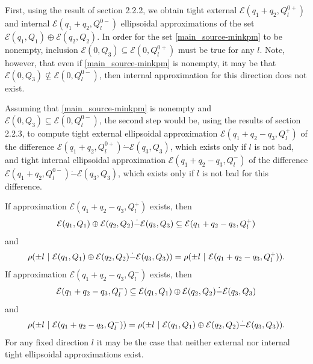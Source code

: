 \documentclass[letterpaper,10pt,english]{sphinxmanual}
\begin{document}
First, using the result of section 2.2.2, we obtain tight external
${\mathcal E}(q_1+q_2,Q_l^{0+})$ and internal
${\mathcal E}(q_1+q_2,Q_l^{0-})$ ellipsoidal approximations of the
set ${\mathcal E}(q_1,Q_1)\oplus{\mathcal E}(q_2,Q_2)$. In order
for the set \eqref{main_source-minkpm} to be nonempty, inclusion
${\mathcal E}(0,Q_3)\subseteq{\mathcal E}(0,Q_l^{0+})$ must be
true for any $l$. Note, however, that even if \eqref{main_source-minkpm} is
nonempty, it may be that
${\mathcal E}(0,Q_3)\not\subseteq{\mathcal E}(0,Q_l^{0-})$, then
internal approximation for this direction does not exist.

Assuming that \eqref{main_source-minkpm} is nonempty and
${\mathcal E}(0,Q_3)\subseteq{\mathcal E}(0,Q_l^{0-})$, the second
step would be, using the results of section 2.2.3, to compute tight
external ellipsoidal approximation
${\mathcal E}(q_1+q_2-q_3,Q_l^+)$ of the difference
${\mathcal E}(q_1+q_2,Q_l^{0+})\dot{-}{\mathcal E}(q_3,Q_3)$,
which exists only if $l$ is not bad, and tight internal
ellipsoidal approximation ${\mathcal E}(q_1+q_2-q_3,Q_l^-)$ of the
difference
${\mathcal E}(q_1+q_2,Q_l^{0-})\dot{-}{\mathcal E}(q_3,Q_3)$,
which exists only if $l$ is not bad for this difference.

If approximation ${\mathcal E}(q_1+q_2-q_3,Q_l^+)$ exists, then
\begin{gather}
\begin{split}{\mathcal E}(q_1,Q_1)\oplus{\mathcal E}(q_2,Q_2)\dot{-}{\mathcal E}(q_3,Q_3) \subseteq
{\mathcal E}(q_1+q_2-q_3,Q_l^+)\end{split}\notag
\end{gather}
and
\begin{gather}
\begin{split}\rho(\pm l ~|~ {\mathcal E}(q_1,Q_1)\oplus{\mathcal E}(q_2,Q_2)\dot{-}{\mathcal E}(q_3,Q_3)) =
\rho(\pm l ~|~ {\mathcal E}(q_1+q_2-q_3,Q_l^+)).\end{split}\notag
\end{gather}
If approximation ${\mathcal E}(q_1+q_2-q_3,Q_l^-)$ exists, then
\begin{gather}
\begin{split}{\mathcal E}(q_1+q_2-q_3,Q_l^-) \subseteq
{\mathcal E}(q_1,Q_1)\oplus{\mathcal E}(q_2,Q_2)\dot{-}{\mathcal E}(q_3,Q_3)\end{split}\notag
\end{gather}
and
\begin{gather}
\begin{split}\rho(\pm l ~|~{\mathcal E}(q_1+q_2-q_3,Q_l^-)) =
\rho(\pm l ~|~ {\mathcal E}(q_1,Q_1)\oplus{\mathcal E}(q_2,Q_2)\dot{-}{\mathcal E}(q_3,Q_3)) .\end{split}\notag
\end{gather}
For any fixed direction $l$ it may be the case that neither
external nor internal tight ellipsoidal approximations exist.
\end{document}

